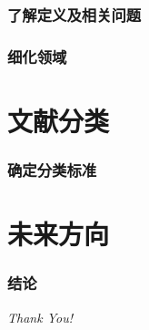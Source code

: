 \documentclass[hyperref={pdfpagelabels=false}]{beamer}
\begin{document}
\begin{frame}
	\frametitle{了解定义及相关问题}
\end{frame}


\begin{frame}
	\frametitle{细化领域}
\end{frame}



\section{文献分类}
\begin{frame}
	\tableofcontents[currentsection]
\end{frame} 
\begin{frame}
	\frametitle{确定分类标准}
\end{frame}



\section{未来方向}
\begin{frame}
	\tableofcontents[currentsection]
\end{frame} 
\begin{frame}
	\frametitle{结论}

\end{frame}



\begin{frame}{}
	\centering \Huge
	\emph{Thank You!}
\end{frame} 
\end{document}
